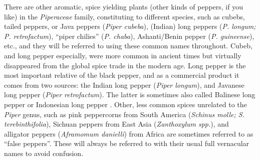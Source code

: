 There are other aromatic, spice yielding plants (other kinds of peppers, if you like) in the \textit{Piperaceae} family, constituting to different species, such as cubebs, tailed peppers, or Java peppers (\textit{Piper cubeba}), (Indian) long peppers (\textit{P. longum; P. retrofactum}), ``piper chilies'' (\textit{P. chaba}), Ashanti/Benin pepper (\textit{P. guineense}), etc., and they will be referred to using these common names throughout. Cubeb, and  long pepper especially, were more common in ancient times but virtually disappeared from the global spice trade in the modern age. Long pepper is the most important relative of the black pepper, and as a commercial product it comes from two sources: the Indian long pepper (\textit{Piper longum}), and Javanese long pepper (\textit{Piper retrofactum}). The latter is sometimes also called Balinese long pepper or Indonesian long pepper . Other, less common spices unrelated to the \textit{Piper} genus, such as pink peppercorns from South America (\textit{Schinus molle; S. terebinthifolia}), Sichuan peppers from East Asia (\textit{Zanthoxylum spp.}), and alligator peppers (\textit{Aframomum danielli}) from Africa are sometimes referred to as ``false peppers''. These will always be referred to with their usual full vernacular names to avoid confusion.



